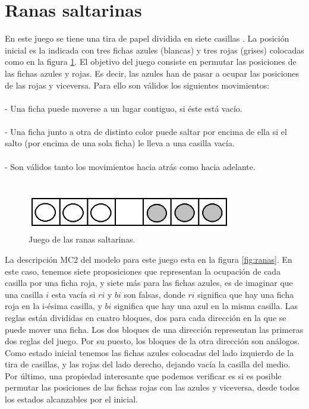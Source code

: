\section{Ranas saltarinas}

En este juego se tiene una tira de papel dividida en siete casillas \cite{Juegos:11}. La posición inicial es la indicada con tres fichas azules (blancas) y tres rojas (grises) colocadas como en la figura \ref{fig:ranasjuego}. El objetivo del juego consiste en permutar las posiciones de las fichas azules y rojas. Es decir, las azules han de pasar a ocupar las posiciones de las rojas y viceversa. Para ello son válidos los siguientes movimientos:\\
\\
- Una ficha puede moverse a un lugar contiguo, si éste está vacío.\\
\\
- Una ficha junto a otra de distinto color puede saltar por encima de ella si el salto (por encima de una sola ficha) le lleva a una casilla vacía.\\
\\
- Son válidos tanto los movimientos hacia atrás como hacia adelante.\\
\\

\begin{figure}[H]
  \centering
  \includegraphics[width=0.8\textwidth]{Figures/ranasjuego.png}
  \caption{Juego de las ranas saltarinas.}
  \label{fig:ranasjuego}
\end{figure}

\noindent La descripción MC2 del modelo para este juego esta en la figura \ref{fig:ranas}. En este caso, tenemos siete proposiciones que representan la ocupación de cada casilla por una ficha roja, y siete más para las fichas azules, es de imaginar que una casilla $i$ esta vacía si $ri$ y $bi$ son falsas, donde $ri$ significa que hay una ficha roja en la i-ésima casilla, y $bi$ significa que hay una azul en la misma casilla. Las reglas están divididas en cuatro bloques, dos para cada dirección en la que se puede mover una ficha. Los dos bloques de una dirección representan las primeras dos reglas del juego. Por su puesto, los bloques de la otra dirección son análogos. Como estado inicial tenemos las fichas azules colocadas del lado izquierdo de la tira de casillas, y las rojas del lado derecho, dejando vacía la casilla del medio. Por último, una propiedad interesante que podemos verificar es si es posible permutar las posiciones de las fichas rojas con las azules y viceversa, desde todos los estados alcanzables por el inicial. 

